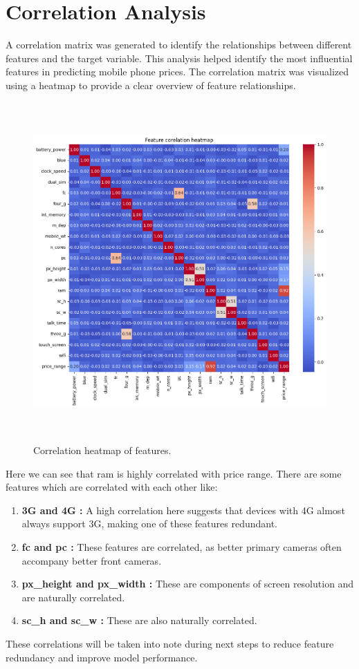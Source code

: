 \documentclass[12pt]{report}
\begin{document}
\section{Correlation Analysis}
A correlation matrix was generated to identify the relationships between different features and the target variable. This analysis helped identify the most influential features in predicting mobile phone prices. The correlation matrix was visualized using a heatmap to provide a clear overview of feature relationships.
\begin{figure}[H]
	\centering
	\includegraphics[height=35em]{corr_viz.png}
	\caption{Correlation heatmap of features.}
	\label{corr_viz}
\end{figure}
Here we can see that ram is highly correlated with price range. There are some features which are correlated with each other like:
\vspace{-1.25em}
\begin{enumerate}
	\setlength\itemsep{-1.05em}
	\item{\textbf{3G and 4G :}} A high correlation here suggests that devices with 4G almost always support 3G, making one of these features redundant.
	\item{\textbf{fc and pc :}} These features are correlated, as better primary cameras often accompany better front cameras.
	\item{\textbf{px\_height and px\_width :}} These are components of screen resolution and are naturally correlated.
	\item{\textbf{sc\_h and sc\_w :}} These are also naturally correlated.
\end{enumerate}
These correlations will be taken into note during next steps to reduce feature redundancy and improve model performance.
\end{document}
